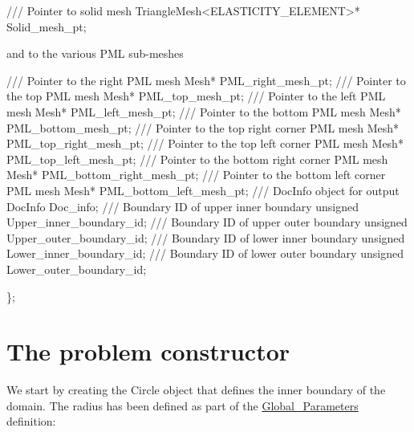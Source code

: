 \begin{DoxyCodeInclude}
 \textcolor{comment}{/// Pointer to solid mesh}
 TriangleMesh<ELASTICITY\_ELEMENT>* Solid\_mesh\_pt;

\end{DoxyCodeInclude}


and to the various P\+ML sub-\/meshes


\begin{DoxyCodeInclude}
 \textcolor{comment}{/// Pointer to the right PML mesh}
 Mesh* PML\_right\_mesh\_pt;
\textcolor{comment}{}
\textcolor{comment}{ /// Pointer to the top PML mesh}
\textcolor{comment}{} Mesh* PML\_top\_mesh\_pt;
\textcolor{comment}{}
\textcolor{comment}{ /// Pointer to the left PML mesh}
\textcolor{comment}{} Mesh* PML\_left\_mesh\_pt;
\textcolor{comment}{}
\textcolor{comment}{ /// Pointer to the bottom PML mesh}
\textcolor{comment}{} Mesh* PML\_bottom\_mesh\_pt;
\textcolor{comment}{}
\textcolor{comment}{ /// Pointer to the top right corner PML mesh}
\textcolor{comment}{} Mesh* PML\_top\_right\_mesh\_pt;
\textcolor{comment}{}
\textcolor{comment}{ /// Pointer to the top left corner PML mesh}
\textcolor{comment}{} Mesh* PML\_top\_left\_mesh\_pt;
\textcolor{comment}{}
\textcolor{comment}{ /// Pointer to the bottom right corner PML mesh}
\textcolor{comment}{} Mesh* PML\_bottom\_right\_mesh\_pt;
\textcolor{comment}{}
\textcolor{comment}{ /// Pointer to the bottom left corner PML mesh}
\textcolor{comment}{} Mesh* PML\_bottom\_left\_mesh\_pt;
\textcolor{comment}{}
\textcolor{comment}{ /// DocInfo object for output}
\textcolor{comment}{} DocInfo Doc\_info;
\textcolor{comment}{}
\textcolor{comment}{ /// Boundary ID of upper inner boundary}
\textcolor{comment}{} \textcolor{keywordtype}{unsigned} Upper\_inner\_boundary\_id;
 \textcolor{comment}{}
\textcolor{comment}{ /// Boundary ID of upper outer boundary}
\textcolor{comment}{} \textcolor{keywordtype}{unsigned} Upper\_outer\_boundary\_id;
\textcolor{comment}{}
\textcolor{comment}{ /// Boundary ID of lower inner boundary}
\textcolor{comment}{} \textcolor{keywordtype}{unsigned} Lower\_inner\_boundary\_id;
 \textcolor{comment}{}
\textcolor{comment}{ /// Boundary ID of lower outer boundary}
\textcolor{comment}{} \textcolor{keywordtype}{unsigned} Lower\_outer\_boundary\_id;
 
\};

\end{DoxyCodeInclude}




 

\hypertarget{index_constructor}{}\section{The problem constructor}\label{index_constructor}
We start by creating the {\ttfamily Circle} object that defines the inner boundary of the domain. The radius has been defined as part of the {\ttfamily \hyperlink{namespaceGlobal__Parameters}{Global\+\_\+\+Parameters}} definition\+:

